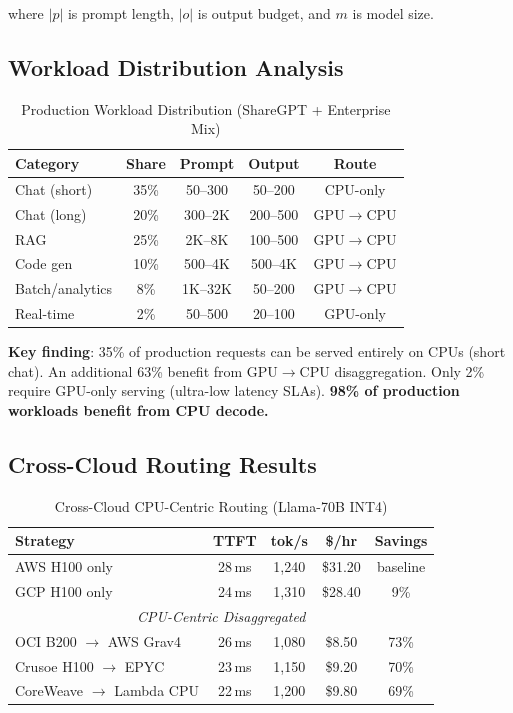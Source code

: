 \documentclass[conference,10pt]{IEEEtran}
\begin{document}
\noindent where $|p|$ is prompt length, $|o|$ is output budget, and $m$ is model size.

\subsection{Workload Distribution Analysis}

\begin{table}[!htbp]
\caption{Production Workload Distribution (ShareGPT + Enterprise Mix)}
\label{tab:workload}
\centering\footnotesize
\begin{tabular}{@{}lcccc@{}}
\toprule
\textbf{Category} & \textbf{Share} & \textbf{Prompt} & \textbf{Output} & \textbf{Route} \\
\midrule
Chat (short) & 35\% & 50--300 & 50--200 & CPU-only \\
Chat (long) & 20\% & 300--2K & 200--500 & GPU$\to$CPU \\
RAG & 25\% & 2K--8K & 100--500 & GPU$\to$CPU \\
Code gen & 10\% & 500--4K & 500--4K & GPU$\to$CPU \\
Batch/analytics & 8\% & 1K--32K & 50--200 & GPU$\to$CPU \\
Real-time & 2\% & 50--500 & 20--100 & GPU-only \\
\bottomrule
\end{tabular}
\end{table}

\textbf{Key finding}: 35\% of production requests can be served entirely on CPUs (short chat). An additional 63\% benefit from GPU$\to$CPU disaggregation. Only 2\% require GPU-only serving (ultra-low latency SLAs). \textbf{98\% of production workloads benefit from CPU decode.}

\subsection{Cross-Cloud Routing Results}

\begin{table}[!htbp]
\caption{Cross-Cloud CPU-Centric Routing (Llama-70B INT4)}
\label{tab:crosscloud}
\centering\footnotesize
\begin{tabular}{@{}lcccc@{}}
\toprule
\textbf{Strategy} & \textbf{TTFT} & \textbf{tok/s} & \textbf{\$/hr} & \textbf{Savings} \\
\midrule
AWS H100 only & 28\,ms & 1,240 & \$31.20 & baseline \\
GCP H100 only & 24\,ms & 1,310 & \$28.40 & 9\% \\
\midrule
\multicolumn{5}{c}{\textit{CPU-Centric Disaggregated}} \\
\midrule
OCI B200 $\to$ AWS Grav4 & 26\,ms & 1,080 & \$8.50 & 73\% \\
Crusoe H100 $\to$ EPYC & 23\,ms & 1,150 & \$9.20 & 70\% \\
CoreWeave $\to$ Lambda CPU & 22\,ms & 1,200 & \$9.80 & 69\% \\
\bottomrule
\end{tabular}
\end{table}
\end{document}
